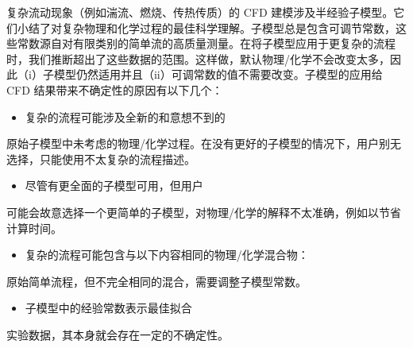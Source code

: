 \documentclass[11pt,a4paper,openany,fontset=none]{ctexbook}
\begin{document}
复杂流动现象（例如湍流、燃烧、传热传质）的 CFD 建模涉及半经验子模型。它们小结了对复杂物理和化学过程的最佳科学理解。子模型总是包含可调节常数，这些常数源自对有限类别的简单流的高质量测量。在将子模型应用于更复杂的流程时，我们推断超出了这些数据的范围。这样做，默认物理/化学不会改变太多，因此（i）子模型仍然适用并且（ii）可调常数的值不需要改变。子模型的应用给 CFD 结果带来不确定性的原因有以下几个：

\begin{itemize}

\item 复杂的流程可能涉及全新的和意想不到的

\end{itemize}

原始子模型中未考虑的物理/化学过程。在没有更好的子模型的情况下，用户别无选择，只能使用不太复杂的流程描述。

\begin{itemize}

\item 尽管有更全面的子模型可用，但用户

\end{itemize}

可能会故意选择一个更简单的子模型，对物理/化学的解释不太准确，例如以节省计算时间。

\begin{itemize}

\item 复杂的流程可能包含与以下内容相同的物理/化学混合物：

\end{itemize}

原始简单流程，但不完全相同的混合，需要调整子模型常数。

\begin{itemize}

\item 子模型中的经验常数表示最佳拟合

\end{itemize}

实验数据，其本身就会存在一定的不确定性。
\end{document}
